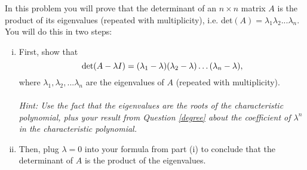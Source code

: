 \begin{question}
\normalfont In this problem you will prove that the determinant of an $n\times n$ matrix $A$ is the product of its eigenvalues (repeated with multiplicity), i.e. det$(A) =\lambda_1\lambda_2...\lambda_n$. You will do this in two steps:
\begin{enumerate}[(i)]
\item First, show that 
\[
\textup{det}(A-\lambda I) = (\lambda_1 - \lambda)(\lambda_2 - \lambda) \ldots (\lambda_n-\lambda),
\]
where $\lambda_1, \lambda_2,...\lambda_n$ are the eigenvalues of $A$ (repeated with multiplicity). \\ \\
\emph{Hint: Use the fact that the eigenvalues are the roots of the characteristic polynomial, plus your result from Question \ref{degree} about the coefficient of $\lambda^n$ in the characteristic polynomial.}

\item Then, plug $\lambda=0$ into your formula from part (i) to conclude that the determinant of $A$ is the product of the eigenvalues. 
\end{enumerate}



\end{question}